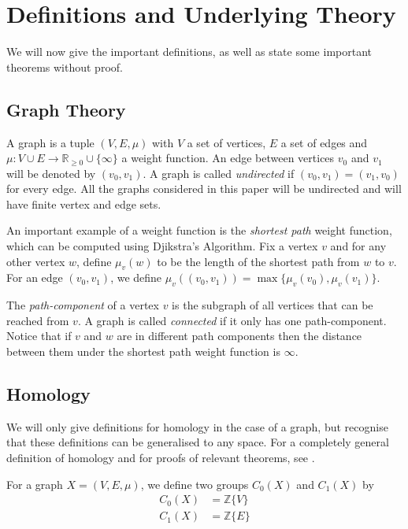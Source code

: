 \documentclass[12pt,a4paper]{amsart}
\numberwithin{equation}{section}
\def\Z{{\mathbb Z}}
\theoremstyle{plain}
\theoremstyle{definition}
\begin{document}
\section{Definitions and Underlying Theory}

We will now give the important definitions, as well as state some important theorems without proof.

\subsection{Graph Theory}

A graph is a tuple $(V, E, \mu)$ with $V$ a set of vertices, $E$ a set of edges and $\mu : V \cup E \to \mathbb{R}_{\geq 0} \cup \{\infty\}$ a weight function. An edge between vertices $v_0$ and $v_1$ will be denoted by $(v_0, v_1)$. A graph is called \textit{undirected} if $(v_0, v_1) = (v_1, v_0)$ for every edge. All the graphs considered in this paper will be undirected and will have finite vertex and edge sets.

An important example of a weight function is the \textit{shortest path} weight function, which can be computed using Djikstra's Algorithm. Fix a vertex $v$ and for any other vertex $w$, define $\mu_v(w)$ to be the length of the shortest path from $w$ to $v$. For an edge $(v_0, v_1)$, we define $\mu_v((v_0, v_1)) = \max\{\mu_v(v_0), \mu_v(v_1)\}$.

The \textit{path-component} of a vertex $v$ is the subgraph of all vertices that can be reached from $v$. A graph is called \textit{connected} if it only has one path-component. Notice that if $v$ and $w$ are in different path components then the distance between them under the shortest path weight function is $\infty$.

\subsection{Homology}

We will only give definitions for homology in the case of a graph, but recognise that these definitions can be generalised to any space. For a completely general definition of homology and for proofs of relevant theorems, see \cite{hatcher}.

For a graph $X = (V, E, \mu)$, we define two groups $C_0(X)$ and $C_1(X)$ by
\begin{align*}
C_0(X) &= \Z\{V\}  \\
C_1(X) &= \Z\{E\}
\end{align*}
\end{document}
